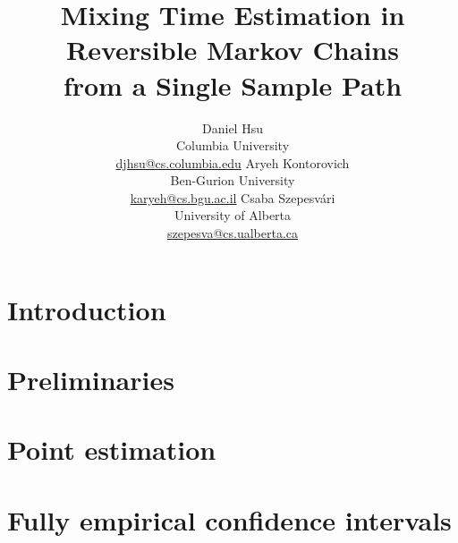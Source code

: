 \documentclass{article}
\title{%
  Mixing Time Estimation in Reversible Markov Chains \\
  from a Single Sample Path%
}
\author{%
  Daniel Hsu \\
  Columbia University \\
  \url{djhsu@cs.columbia.edu}
  \And
  Aryeh Kontorovich \\
  Ben-Gurion University \\
  \url{karyeh@cs.bgu.ac.il}
  \And
  Csaba Szepesv\'ari \\
  University of Alberta \\
  \url{szepesva@cs.ualberta.ca}
}
\begin{document}
\maketitle

\begin{abstract} 

\end{abstract} 

\section{Introduction}\label{sec:intro}


\section{Preliminaries}\label{sec:prelim}


\section{Point estimation}\label{sec:rates}


\section{Fully empirical confidence intervals}\label{sec:empirical}


%




%
%
%
%
%
%
%
%
\end{document}
